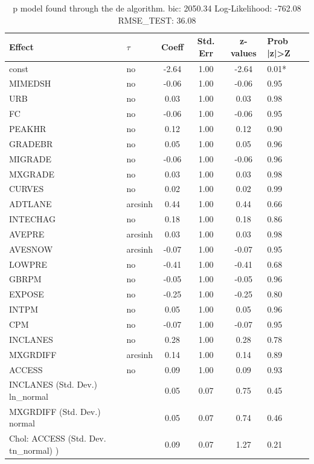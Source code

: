 \begin{table}
	\caption{p model found through the de algorithm. bic: 2050.34 Log-Likelihood: -762.08 RMSE_TEST: 36.08}
	\begin{center}
		\begin{tabular}{|l|l|c|c|c|l|}
			\hline
			Effect & $\tau$ & Coeff & Std. Err & z-values & Prob |z|>Z \\
			\hline
			const & no & -2.64 & 1.00 & -2.64 & 0.01* \\
			\hline
			MIMEDSH & no & -0.06 & 1.00 & -0.06 & 0.95 \\
			\hline
			URB & no & 0.03 & 1.00 & 0.03 & 0.98 \\
			\hline
			FC & no & -0.06 & 1.00 & -0.06 & 0.95 \\
			\hline
			PEAKHR & no & 0.12 & 1.00 & 0.12 & 0.90 \\
			\hline
			GRADEBR & no & 0.05 & 1.00 & 0.05 & 0.96 \\
			\hline
			MIGRADE & no & -0.06 & 1.00 & -0.06 & 0.96 \\
			\hline
			MXGRADE & no & 0.03 & 1.00 & 0.03 & 0.98 \\
			\hline
			CURVES & no & 0.02 & 1.00 & 0.02 & 0.99 \\
			\hline
			ADTLANE & arcsinh & 0.44 & 1.00 & 0.44 & 0.66 \\
			\hline
			INTECHAG & no & 0.18 & 1.00 & 0.18 & 0.86 \\
			\hline
			AVEPRE & arcsinh & 0.03 & 1.00 & 0.03 & 0.98 \\
			\hline
			AVESNOW & arcsinh & -0.07 & 1.00 & -0.07 & 0.95 \\
			\hline
			LOWPRE & no & -0.41 & 1.00 & -0.41 & 0.68 \\
			\hline
			GBRPM & no & -0.05 & 1.00 & -0.05 & 0.96 \\
			\hline
			EXPOSE & no & -0.25 & 1.00 & -0.25 & 0.80 \\
			\hline
			INTPM & no & 0.05 & 1.00 & 0.05 & 0.96 \\
			\hline
			CPM & no & -0.07 & 1.00 & -0.07 & 0.95 \\
			\hline
			INCLANES & no & 0.28 & 1.00 & 0.28 & 0.78 \\
			\hline
			MXGRDIFF & arcsinh & 0.14 & 1.00 & 0.14 & 0.89 \\
			\hline
			ACCESS & no & 0.09 & 1.00 & 0.09 & 0.93 \\
			\hline
			INCLANES (Std. Dev.) ln_normal &  & 0.05 & 0.07 & 0.75 & 0.45 \\
			\hline
			MXGRDIFF (Std. Dev.) normal &  & 0.05 & 0.07 & 0.74 & 0.46 \\
			\hline
			 Chol: ACCESS (Std. Dev. tn_normal) ) &  & 0.09 & 0.07 & 1.27 & 0.21 \\
			\hline
		\end{tabular}
	\end{center}
\end{table}